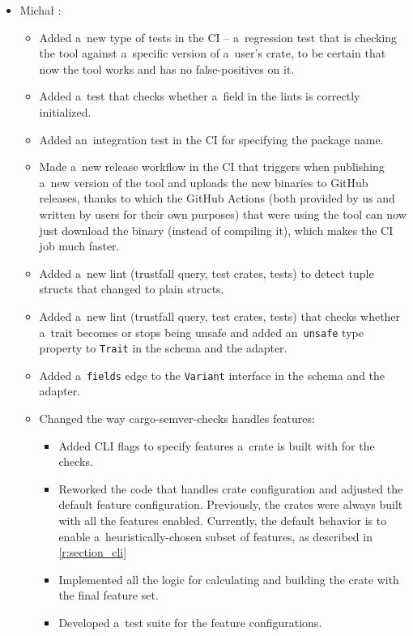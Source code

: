 \documentclass[licencjacka,en]{pracamgr}
\begin{document}
\begin{itemize}
	\item Michał \cite{responsibilities-michal}:
		\begin{itemize}
			\item Added a~new type of tests in the CI -- a~regression test that is checking
				the tool against a~specific version of a~user's crate, to be certain that now
				the tool works and has no false-positives on it.
			\item Added a~test that checks whether a~field in the lints is correctly initialized.
			\item Added an~integration test in the CI for specifying the package name.
			\item Made a~new release workflow in the CI that triggers when publishing a~new version
				of the tool and uploads the new binaries to GitHub releases, thanks to which
				the GitHub Actions (both provided by us and written by users for their
				own purposes) that were using the tool can now just download the binary
				(instead of compiling it), which makes the CI job much faster.
			\item Added a~new lint (trustfall query, test crates, tests) to detect tuple structs
				that changed to plain structs.
			\item Added a~new lint (trustfall query, test crates, tests) that checks whether
				a~trait becomes or stops being unsafe and added an~\texttt{unsafe} type property
				to \texttt{Trait} in the schema and the adapter.
			\item Added a~\texttt{fields} edge to the \texttt{Variant} interface in the schema
				and the adapter.
                        \item Changed the way cargo-semver-checks handles features:
                        \begin{itemize}
                            \item Added CLI flags to specify features a~crate is built with for
								the checks.
                            \item Reworked the code that handles crate configuration and adjusted
                                    the default feature configuration.
                                    Previously, the crates were always built with all
									the features enabled. Currently, the default behavior is
									to enable a~heuristically-chosen subset of features,
									as described in \ref{r:section_cli}
                            \item Implemented all the logic for calculating and building the crate
                                    with the final feature set.
                            \item Developed a~test suite for the feature configurations.
                        \end{itemize}
		\end{itemize}


\end{itemize}
\end{document}
